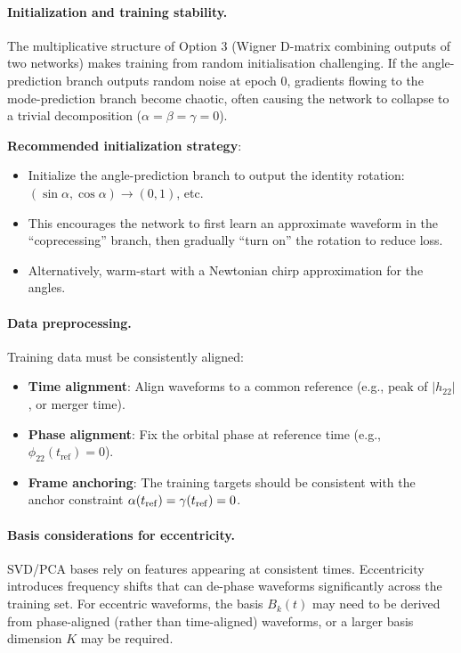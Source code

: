 \documentclass[11pt,a4paper]{article}
\begin{document}
\paragraph{Initialization and training stability.}
The multiplicative structure of Option 3 (Wigner D-matrix combining outputs of two networks) makes training from random initialisation challenging. If the angle-prediction branch outputs random noise at epoch 0, gradients flowing to the mode-prediction branch become chaotic, often causing the network to collapse to a trivial decomposition ($\alpha = \beta = \gamma = 0$).

\textbf{Recommended initialization strategy}:
\begin{itemize}
    \item Initialize the angle-prediction branch to output the identity rotation: $(\sin\alpha, \cos\alpha) \to (0, 1)$, etc.
    \item This encourages the network to first learn an approximate waveform in the ``coprecessing'' branch, then gradually ``turn on'' the rotation to reduce loss.
    \item Alternatively, warm-start with a Newtonian chirp approximation for the angles.
\end{itemize}

\paragraph{Data preprocessing.}
Training data must be consistently aligned:
\begin{itemize}
    \item \textbf{Time alignment}: Align waveforms to a common reference (e.g., peak of $|h_{22}|$, or merger time).
    \item \textbf{Phase alignment}: Fix the orbital phase at reference time (e.g., $\phi_{22}(t_{\text{ref}}) = 0$).
    \item \textbf{Frame anchoring}: The training targets should be consistent with the anchor constraint $\alpha(t_{\rm ref}) = \gamma(t_{\rm ref}) = 0$.
\end{itemize}

\paragraph{Basis considerations for eccentricity.}
SVD/PCA bases rely on features appearing at consistent times. Eccentricity introduces frequency shifts that can de-phase waveforms significantly across the training set. For eccentric waveforms, the basis $B_k(t)$ may need to be derived from phase-aligned (rather than time-aligned) waveforms, or a larger basis dimension $K$ may be required.
\end{document}
